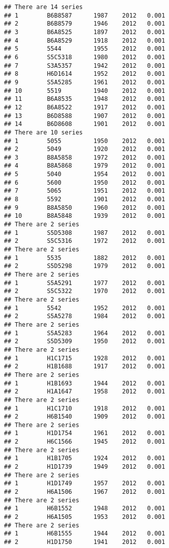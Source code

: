 \documentclass[]{article}
\begin{document}
\begin{verbatim}
## There are 14 series
## 1        B6B8587      1987    2012   0.001
## 2        B6B8579      1946    2012   0.001
## 3        B6A8525      1897    2012   0.001
## 4        B6A8529      1918    2012   0.001
## 5        5544         1955    2012   0.001
## 6        S5C5318      1980    2012   0.001
## 7        S3A5357      1942    2012   0.001
## 8        H6D1614      1952    2012   0.001
## 9        S5A5285      1961    2012   0.001
## 10       5519         1940    2012   0.001
## 11       B6A8535      1948    2012   0.001
## 12       B6A8522      1917    2012   0.001
## 13       B6D8588      1907    2012   0.001
## 14       B6D8608      1901    2012   0.001
## There are 10 series
## 1        5055         1950    2012   0.001
## 2        5049         1920    2012   0.001
## 3        B8A5858      1972    2012   0.001
## 4        B8A5868      1979    2012   0.001
## 5        5040         1954    2012   0.001
## 6        5600         1950    2012   0.001
## 7        5065         1951    2012   0.001
## 8        5592         1901    2012   0.001
## 9        B8A5850      1960    2012   0.001
## 10       B8A5848      1939    2012   0.001
## There are 2 series
## 1        S5D5308      1987    2012   0.001
## 2        S5C5316      1972    2012   0.001
## There are 2 series
## 1        5535         1882    2012   0.001
## 2        S5D5298      1979    2012   0.001
## There are 2 series
## 1        S5A5291      1977    2012   0.001
## 2        S5C5322      1970    2012   0.001
## There are 2 series
## 1        5542         1952    2012   0.001
## 2        S5A5278      1984    2012   0.001
## There are 2 series
## 1        S5A5283      1964    2012   0.001
## 2        S5D5309      1950    2012   0.001
## There are 2 series
## 1        H1C1715      1928    2012   0.001
## 2        H1B1688      1917    2012   0.001
## There are 2 series
## 1        H1B1693      1944    2012   0.001
## 2        H1A1647      1958    2012   0.001
## There are 2 series
## 1        H1C1710      1918    2012   0.001
## 2        H6B1540      1909    2012   0.001
## There are 2 series
## 1        H1D1754      1961    2012   0.001
## 2        H6C1566      1945    2012   0.001
## There are 2 series
## 1        H1B1705      1924    2012   0.001
## 2        H1D1739      1949    2012   0.001
## There are 2 series
## 1        H1D1749      1957    2012   0.001
## 2        H6A1506      1967    2012   0.001
## There are 2 series
## 1        H6B1552      1948    2012   0.001
## 2        H6A1505      1953    2012   0.001
## There are 2 series
## 1        H6B1555      1944    2012   0.001
## 2        H1D1750      1941    2012   0.001

\end{verbatim}
\end{document}
